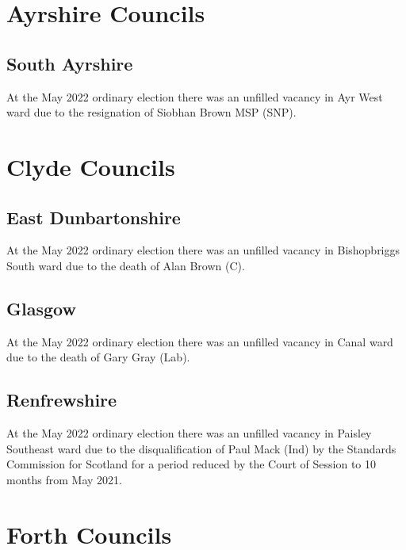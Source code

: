 \documentclass[a4paper,openany]{book}
\begin{document}
\begin{resultsiii}
\section{Ayrshire Councils}

\subsection*{South Ayrshire}

At the May 2022 ordinary election there was an unfilled vacancy in Ayr West ward due to the resignation of Siobhan Brown MSP (SNP).%

\section{Clyde Councils}

\subsection*{East Dunbartonshire}

At the May 2022 ordinary election there was an unfilled vacancy in Bishopbriggs South ward due to the death of Alan Brown (C).%

\subsection*{Glasgow}

At the May 2022 ordinary election there was an unfilled vacancy in Canal ward due to the death of Gary Gray (Lab).%

\subsection*{Renfrewshire}

At the May 2022 ordinary election there was an unfilled vacancy in Paisley Southeast ward due to the disqualification of Paul Mack (Ind) by the Standards Commission for Scotland for a period reduced by the Court of Session to 10 months from May 2021.%

\section{Forth Councils}


\end{resultsiii}
\end{document}
